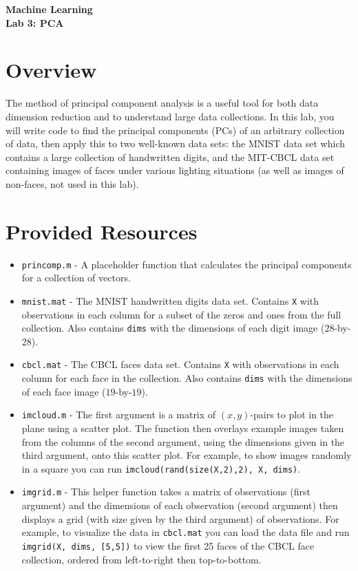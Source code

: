 \documentclass[11pt,noanswers,addpoints]{exam}
\begin{document}
{\Large{\textbf{Machine Learning}}} \\[2mm]
\textbf{\Huge{Lab 3: PCA}}\\[2mm]


\section{Overview}

The method of principal component analysis is a useful tool for both data dimension 
reduction and to understand large data collections. In this lab, you will write code
to find the principal components (PCs) of an arbitrary collection of data, then
apply this to two well-known data sets: the MNIST data set which contains a large collection
of handwritten digits, and the MIT-CBCL data set containing images of faces under various
lighting situations (as well as images of non-faces, not used in this lab).

\section{Provided Resources}

\begin{itemize}

\item \texttt{princomp.m} - A placeholder function that calculates the principal components for
a collection of vectors.
\item \texttt{mnist.mat} - The MNIST handwritten digits data set. Contains \texttt{X} with observations in each column
for a subset of the zeros and ones from the full collection. Also contains \texttt{dims}
with the dimensions of each digit image ($28$-by-$28$).
\item \texttt{cbcl.mat} - The CBCL faces data set. Contains \texttt{X} with observations in each column
for each face in the collection. Also contains \texttt{dims}
with the dimensions of each face image ($19$-by-$19$).
\item \texttt{imcloud.m} - The first argument is a matrix of $(x,y)$-pairs to plot in the
plane using a scatter plot. The function then overlays example images taken from the columns of
the second argument, using the dimensions given in the third argument, onto this scatter plot. For example,
to show images randomly in a square you can run
\texttt{imcloud(rand(size(X,2),2), X, dims)}.
\item \texttt{imgrid.m} - This helper function takes a matrix of observations (first argument)
and the dimensions of each observation (second argument) then displays a grid (with size given by
the third argument) of observations. For example, to visualize the data in
\texttt{cbcl.mat} you can load the data file and run
\texttt{imgrid(X, dims, [5,5])}
to view the first 25 faces of the CBCL face collection, ordered from left-to-right then top-to-bottom.
\end{itemize}
\end{document}
